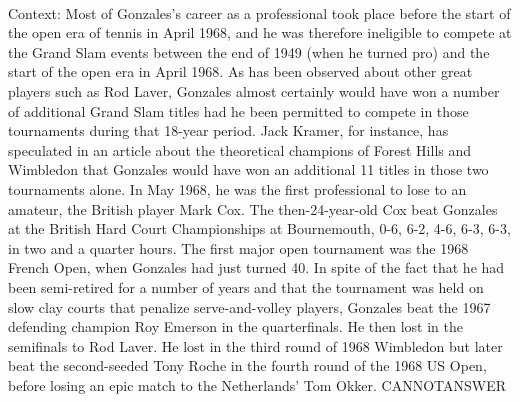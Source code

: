 \documentclass[11pt,a4paper, onecolumn]{article}
\begin{document}
\\ Context: Most of Gonzales's career as a professional took place before the start of the open era of tennis in April 1968, and he was therefore ineligible to compete at the Grand Slam events between the end of 1949 (when he turned pro) and the start of the open era in April 1968. As has been observed about other great players such as Rod Laver, Gonzales almost certainly would have won a number of additional Grand Slam titles had he been permitted to compete in those tournaments during that 18-year period. Jack Kramer, for instance, has speculated in an article about the theoretical champions of Forest Hills and Wimbledon that Gonzales would have won an additional 11 titles in those two tournaments alone. In May 1968, he was the first professional to lose to an amateur, the British player Mark Cox. The then-24-year-old Cox beat Gonzales at the British Hard Court Championships at Bournemouth, 0-6, 6-2, 4-6, 6-3, 6-3, in two and a quarter hours. The first major open tournament was the 1968 French Open, when Gonzales had just turned 40. In spite of the fact that he had been semi-retired for a number of years and that the tournament was held on slow clay courts that penalize serve-and-volley players, Gonzales beat the 1967 defending champion Roy Emerson in the quarterfinals. He then lost in the semifinals to Rod Laver. He lost in the third round of 1968 Wimbledon but later beat the second-seeded Tony Roche in the fourth round of the 1968 US Open, before losing an epic match to the Netherlands' Tom Okker. CANNOTANSWER
\end{document}
